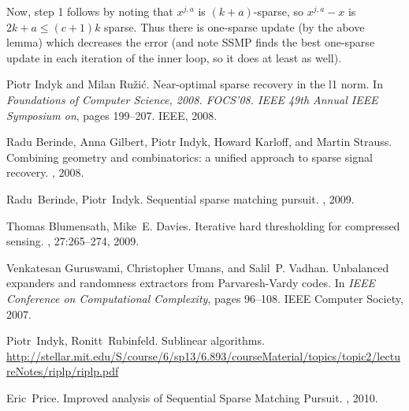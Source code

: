 \documentclass[11pt]{article}
\begin{document}
Now, step 1 follows by noting that $x^{j,a}$ is $(k+a)$-sparse, so $x^{j,a} - x$ is $2k+a \le (c+1)k$ sparse. Thus there is one-sparse update (by the above lemma) which decreases the error (and note SSMP finds the best one-sparse update in each iteration of the inner loop, so it does at least as well).



\begin{thebibliography}{42}
Piotr Indyk and Milan Ru\v{z}i\'{c}.
\newblock Near-optimal sparse recovery in the l1 norm.
\newblock In {\em Foundations of Computer Science, 2008. FOCS'08. IEEE 49th
  Annual IEEE Symposium on}, pages 199--207. IEEE, 2008.

Radu Berinde, Anna Gilbert, Piotr Indyk, Howard Karloff, and Martin Strauss.
\newblock Combining geometry and combinatorics: a unified approach to sparse signal recovery.
, 2008.

Radu~Berinde, Piotr~Indyk.
\newblock Sequential sparse matching pursuit.
, 2009.

Thomas Blumensath, Mike~E. Davies.
\newblock Iterative hard thresholding for compressed sensing.
, 27:265--274, 2009.

Venkatesan Guruswami, Christopher Umans, and Salil~P. Vadhan.
\newblock Unbalanced expanders and randomness extractors from Parvaresh-Vardy
  codes.
\newblock In {\em IEEE Conference on Computational Complexity}, pages 96--108.
  IEEE Computer Society, 2007.

Piotr~Indyk, Ronitt~Rubinfeld.
\newblock Sublinear algorithms.
\newblock \url{http://stellar.mit.edu/S/course/6/sp13/6.893/courseMaterial/topics/topic2/lectureNotes/riplp/riplp.pdf}

Eric~Price.
\newblock Improved analysis of Sequential Sparse Matching Pursuit.
, 2010.
  
\end{thebibliography}
\end{document}
